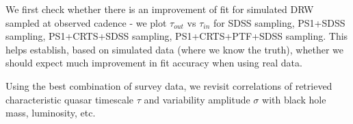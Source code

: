 \documentclass[twocolumn]{aastex62}
\begin{document}
We first check whether there is an improvement of fit for simulated DRW sampled at observed cadence - we plot $\tau_{out}$ vs $\tau_{in}$  for    SDSS sampling,    PS1+SDSS sampling,  PS1+CRTS+SDSS sampling,   PS1+CRTS+PTF+SDSS sampling.  This helps establish, based on simulated data (where we know the truth), whether we should expect much improvement in fit accuracy when using real data. 


Using the best combination of survey data,  we revisit \cite{macleod2011} correlations of retrieved characteristic quasar timescale $\tau$ and variability amplitude $\sigma$ with black hole mass, luminosity, etc.  






 


\end{document}

